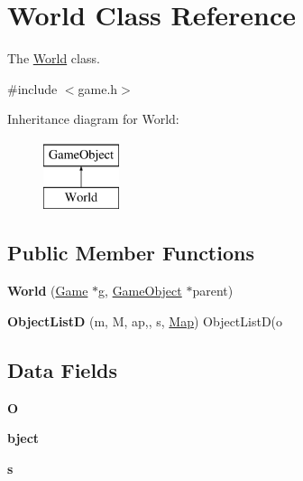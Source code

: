\hypertarget{class_world}{}\section{World Class Reference}
\label{class_world}


The \hyperlink{class_world}{World} class.  




{\ttfamily \#include $<$game.\+h$>$}

Inheritance diagram for World\+:\begin{figure}[H]
\begin{center}
\leavevmode
\includegraphics[height=2.000000cm]{class_world}
\end{center}
\end{figure}
\subsection*{Public Member Functions}
\begin{DoxyCompactItemize}
\item 
\hypertarget{class_world_a8f2e7de9a7533ed84dbff13b73ab77ef}{}\label{class_world_a8f2e7de9a7533ed84dbff13b73ab77ef} 
{\bfseries World} (\hyperlink{class_game}{Game} $\ast$g, \hyperlink{class_game_object}{Game\+Object} $\ast$parent)
\item 
\hypertarget{class_world_a7fe6abb143814e0f87145648982f46af}{}\label{class_world_a7fe6abb143814e0f87145648982f46af} 
{\bfseries Object\+ListD} (m, M, ap,, s, \hyperlink{class_map}{Map}) Object\+ListD(o
\end{DoxyCompactItemize}
\subsection*{Data Fields}
\begin{DoxyCompactItemize}
\item 
\hypertarget{class_world_a180c9e33dc6e59ca8e097bc9e6a36503}{}\label{class_world_a180c9e33dc6e59ca8e097bc9e6a36503} 
{\bfseries O}
\item 
\hypertarget{class_world_a2c3ed57fb27e57a197a2218f196950e2}{}\label{class_world_a2c3ed57fb27e57a197a2218f196950e2} 
{\bfseries bject}
\item 
\hypertarget{class_world_a985aab8b792338c2a1718f4ec46f88dc}{}\label{class_world_a985aab8b792338c2a1718f4ec46f88dc} 
{\bfseries s}
\end{DoxyCompactItemize}
